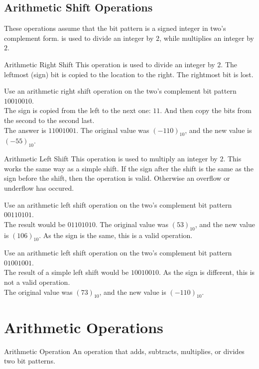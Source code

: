\documentclass[../notes.tex]{subfiles}
\begin{document}
			\subsection{Arithmetic Shift Operations}
				These operations assume that the bit pattern is a signed integer in two's complement form.  is used to divide an integer by $2$, while  multiplies an integer by $2$.
				\begin{definition}{Arithmetic Right Shift}
					This operation is used to divide an integer by $2$. The leftmost (sign) bit is copied to the location to the right. The rightmost bit is lost.
					\begin{example}
						Use an arithmetic right shift operation on the two's complement bit pattern $10010010$.\\
						The sign is copied from the left to the next one: $11$. And then copy the bits from the second to the second last.\\
						The answer is $11001001$. The original value was $(-110)_{10}$, and the new value is $(-55)_{10}$.
					\end{example}
				\end{definition}
				\begin{definition}{Arithmetic Left Shift}
					This operation is used to multiply an integer by $2$. This works the same way as a simple shift. If the sign after the shift is the same as the sign before the shift, then the operation is valid. Otherwise an overflow or underflow has occured.
					\begin{example}
						Use an arithmetic left shift operation on the two's complement bit pattern $00110101$.\\
						The result would be $01101010$. The original value was $(53)_{10}$, and the new value is $(106)_{10}$. As the sign is the same, this is a valid operation.
					\end{example}
					\begin{example}
						Use an arithmetic left shift operation on the two's complement bit pattern $01001001$.\\
						The result of a simple left shift would be $10010010$. As the sign is different, this is not a valid operation.\\
						The original value was $(73)_{10}$, and the new value is $(-110)_{10}$.
					\end{example}
				\end{definition}
		\pagebreak
		\section{Arithmetic Operations}
			\begin{definition}{Arithmetic Operation}
				An operation that adds, subtracts, multiplies, or divides two bit patterns.
			\end{definition}
\end{document}
